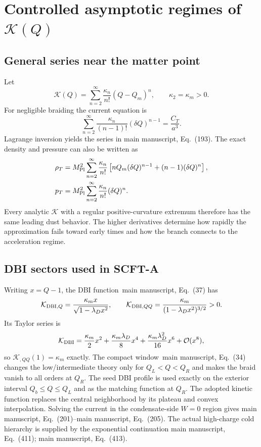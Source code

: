 \documentclass[aps,prd,reprint,onecolumn,notitlepage,nofootinbib,longbibliography,floatfix]{revtex4-2}
\theoremstyle{scstyle}
\theoremstyle{definition}
\theoremstyle{remark}
\newcommand{\mpl}{M_{\rm Pl}}
\newcommand{\cK}{\mathcal K}
\newcommand{\cO}{\mathcal O}
\begin{document}
\section{Controlled asymptotic regimes of \texorpdfstring{$\cK(Q)$}{K(Q)}}
\label{app:Kasymptotics}

\subsection{General series near the matter point}

Let
\begin{equation}
\cK(Q)=\sum_{n=2}^{\infty}\frac{\kappa_n}{n!}(Q-Q_m)^n,
\qquad
\kappa_2=\kappa_m>0.
\label{eq:Kseriesfull}
\end{equation}
For negligible braiding the current equation is
\begin{equation}
\sum_{n=2}^{\infty}\frac{\kappa_n}{(n-1)!}(\delta Q)^{n-1}
=\frac{C_T}{a^3}.
\label{eq:Kseriescurrent}
\end{equation}
Lagrange inversion yields the series in main manuscript, Eq.~(193). The exact density and pressure can also be written as
\begin{align}
\rho_T&=\mpl^2\sum_{n=2}^{\infty}
\frac{\kappa_n}{n!}
\left[nQ_m(\delta Q)^{n-1}+(n-1)(\delta Q)^n\right],
\label{eq:rhoseries}\\
p_T&=\mpl^2\sum_{n=2}^{\infty}
\frac{\kappa_n}{n!}(\delta Q)^n.
\label{eq:pseries}
\end{align}
Every analytic $\cK$ with a regular positive-curvature extremum therefore has the same leading dust behavior. The higher derivatives determine how rapidly the approximation fails toward early times and how the branch connects to the acceleration regime.

\subsection{DBI sectors used in SCFT-A}

Writing $x=Q-1$, the DBI function~main manuscript, Eq.~(37) has
\begin{equation}
\cK_{{\rm DBI},Q}
=\frac{\kappa_m x}{\sqrt{1-\lambda_Dx^2}},
\qquad
\cK_{{\rm DBI},QQ}
=\frac{\kappa_m}{(1-\lambda_Dx^2)^{3/2}}>0.
\label{eq:benchmarkDBIderivatives}
\end{equation}
Its Taylor series is
\begin{equation}
\cK_{\rm DBI}
=\frac{\kappa_m}{2}x^2
+\frac{\kappa_m\lambda_D}{8}x^4
+\frac{\kappa_m\lambda_D^2}{16}x^6
+\cO(x^8),
\label{eq:benchmarkDBIseries}
\end{equation}
so $\cK_{,QQ}(1)=\kappa_m$ exactly. The compact window~main manuscript, Eq.~(34) changes the low/intermediate theory only for $Q_L<Q<Q_R$ and makes the braid vanish to all orders at $Q_R$. The seed DBI profile is used exactly on the exterior interval $Q_b\le Q\le Q_L$ and as the matching function at $Q_R$. The adopted kinetic function replaces the central neighborhood by its plateau and convex interpolation. Solving the current in the condensate-side $W=0$ region gives main manuscript, Eq.~(201)--main manuscript, Eq.~(205). The actual high-charge cold hierarchy is supplied by the exponential continuation main manuscript, Eq.~(411); main manuscript, Eq.~(413).
\end{document}
